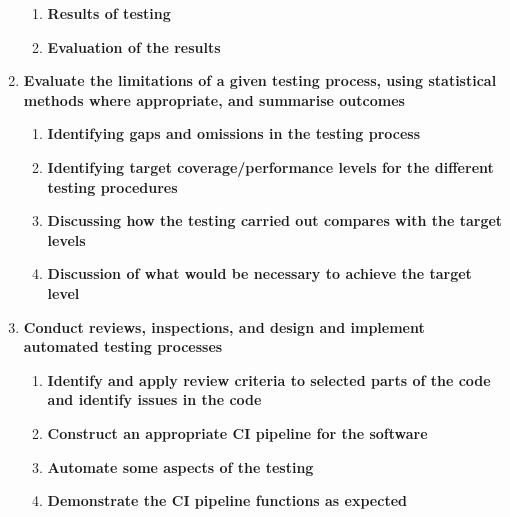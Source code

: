 \documentclass{article}
\begin{document}
\begin{enumerate}
\begin{enumerate}
\item \textbf{Results of testing}
\item \textbf{Evaluation of the results}
\end{enumerate}
\item \textbf{Evaluate the limitations of a given testing process, using statistical methods where appropriate, and summarise outcomes} \marginpar{[default 20\%]}
\begin{enumerate}
\item \textbf{Identifying gaps and omissions in the testing process}
\item \textbf{Identifying target coverage/performance levels for the different testing procedures} 
\item \textbf{Discussing how the testing carried out compares with the target levels}
\item \textbf{Discussion of what would be necessary to achieve the target level}
\end{enumerate}
\item \textbf{Conduct reviews, inspections, and design and implement automated testing processes} \marginpar{[default 20\%]}
\begin{enumerate}    
\item \textbf{Identify and apply review criteria to selected parts of the code and identify issues in the code}
\item \textbf{Construct an appropriate CI pipeline for the software}
\item\textbf{Automate some aspects of the testing}
\item \textbf{Demonstrate the CI pipeline functions as expected}
\end{enumerate}
\end{enumerate}
\end{document}
